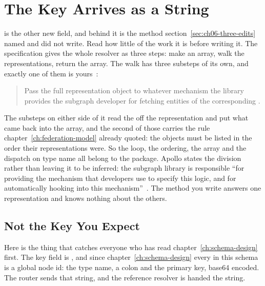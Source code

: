 \section{The Key Arrives as a String}
\label{sec:ch06-the-key-arrives-as-a-string}

%
 is the other new field, and behind it is the method
section~\ref{sec:ch06-three-edits} named and did not write. Read how little of
the work it is before writing it. The specification gives the whole resolver as
three steps: make an array, walk the representations, return the array. The walk
has three substeps of its own, and exactly one of
them is yours~\autocite{apollosubgraphspec}:

\begin{quote}
Pass the full representation object to whatever mechanism the library provides
the subgraph developer for fetching entities of the corresponding
.
\end{quote}

%
The substeps on either side of it read the  off the
representation and put what came back into the array, and the second of those
carries the rule chapter~\ref{ch:federation-model} already quoted: the objects
must be listed in the order their representations were. So the loop, the
ordering, the array and the dispatch on type name all belong to the package.
Apollo states the division rather than leaving it to be inferred: the subgraph
library is responsible \enquote{for providing the mechanism that developers use
to specify this logic, and for automatically hooking into this
mechanism}~\autocite{apollosubgraphspec}. The method you write answers one
representation and knows nothing about the others.

\subsection{Not the Key You Expect}

%
Here is the thing that catches everyone who has read
chapter~\ref{ch:schema-design} first. The key field is , and since
chapter~\ref{ch:schema-design} every  in this schema is a global node
id: the type name, a colon and the primary key, base64 encoded. The router sends
that string, and the reference resolver is handed the string.

